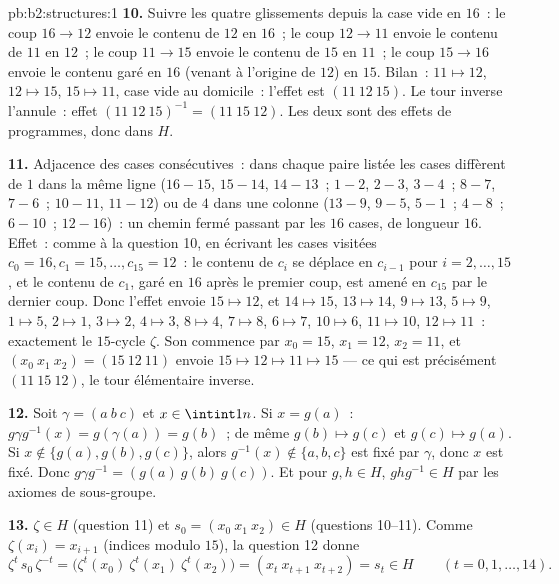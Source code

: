 \begin{solution}{pb:b2:structures:1}
\textbf{10.} Suivre les quatre glissements depuis la case vide en
$16$~: le coup $16 \to 12$ envoie le contenu de $12$ en $16$~; le
coup $12 \to 11$ envoie le contenu de $11$ en $12$~; le coup $11 \to
15$ envoie le contenu de $15$ en $11$~; le coup $15 \to 16$ envoie le
contenu garé en $16$ (venant à l'origine de $12$) en $15$. Bilan~: $11
\mapsto 12$, $12 \mapsto 15$, $15 \mapsto 11$, case vide au domicile~:
l'effet est $(11\ 12\ 15)$. Le tour inverse l'annule~: effet $(11\
12\ 15)^{-1} = (11\ 15\ 12)$. Les deux sont des effets de programmes,
donc dans $H$.

\textbf{11.} Adjacence des cases consécutives~: dans chaque paire
listée les cases diffèrent de $1$ dans la même ligne ($16{-}15$,
$15{-}14$, $14{-}13$~; $1{-}2$, $2{-}3$, $3{-}4$~; $8{-}7$,
$7{-}6$~; $10{-}11$, $11{-}12$) ou de $4$ dans une colonne
($13{-}9$, $9{-}5$, $5{-}1$~; $4{-}8$~; $6{-}10$~; $12{-}16$)~: un
chemin fermé passant par les $16$ cases, de longueur $16$. Effet~:
comme à la question 10, en écrivant les cases visitées $c_0 = 16, c_1
= 15, \dots, c_{15} = 12$~: le contenu de $c_i$ se déplace en
$c_{i-1}$ pour $i = 2, \dots, 15$, et le contenu de $c_1$, garé en
$16$ après le premier coup, est amené en $c_{15}$ par le dernier
coup. Donc l'effet envoie $15 \mapsto 12$, et $14 \mapsto 15$, $13
\mapsto 14$, $9 \mapsto 13$, $5 \mapsto 9$, $1 \mapsto 5$, $2 \mapsto
1$, $3 \mapsto 2$, $4 \mapsto 3$, $8 \mapsto 4$, $7 \mapsto 8$, $6
\mapsto 7$, $10 \mapsto 6$, $11 \mapsto 10$, $12 \mapsto 11$~:
exactement le $15$-cycle $\zeta$. Son   commence par
$x_0 = 15$, $x_1 = 12$, $x_2 = 11$, et $(x_0\ x_1\ x_2) = (15\ 12\
11)$ envoie $15 \mapsto 12 \mapsto 11 \mapsto 15$ --- ce qui est
précisément $(11\ 15\ 12)$, le tour élémentaire inverse.

\textbf{12.} Soit $\gamma = (a\ b\ c)$ et $x \in \intint1n$. Si $x =
g(a)$~: $g\gamma g^{-1}(x) = g(\gamma(a)) = g(b)$~; de même $g(b)
\mapsto g(c)$ et $g(c) \mapsto g(a)$. Si $x \notin \{g(a), g(b),
g(c)\}$, alors $g^{-1}(x) \notin \{a,b,c\}$ est fixé par $\gamma$,
donc $x$ est fixé. Donc $g\gamma g^{-1} = (g(a)\ g(b)\ g(c))$. Et pour
$g, h \in H$, $ghg^{-1} \in H$ par les axiomes de sous-groupe.

\textbf{13.} $\zeta \in H$ (question 11) et $s_0 = (x_0\ x_1\ x_2)
\in H$ (questions 10--11). Comme $\zeta(x_i) = x_{i+1}$ (indices
modulo $15$), la question 12 donne
\[
\zeta^{t}\,s_0\,\zeta^{-t}
= \bigl(\zeta^t(x_0)\ \zeta^t(x_1)\ \zeta^t(x_2)\bigr)
= (x_t\ x_{t+1}\ x_{t+2}) = s_t \in H
\qquad (t = 0, 1, \dots, 14).
\]


\end{solution}
